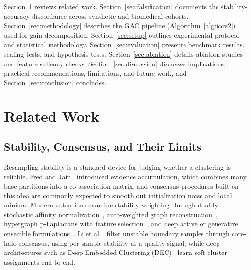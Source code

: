 \documentclass[pdflatex,sn-mathphys-num]{sn-jnl}
\theoremstyle{thmstyleone}
\theoremstyle{thmstyletwo}
\theoremstyle{thmstylethree}
\begin{document}
Section~\ref{sec:related} reviews related work. Section~\ref{sec:falsification} documents the stability-accuracy discordance across synthetic and biomedical cohorts. Section~\ref{sec:methodology} describes the GAC pipeline (Algorithm~\ref{alg:iccv2}) used for gain decomposition. Section~\ref{sec:setup} outlines experimental protocol and statistical methodology. Section~\ref{sec:evaluation} presents benchmark results, scaling tests, and hypothesis tests. Section~\ref{sec:ablation} details ablation studies and feature saliency checks. Section~\ref{sec:discussion} discusses implications, practical recommendations, limitations, and future work, and Section~\ref{sec:conclusion} concludes.


\section{Related Work}\label{sec:related}

\subsection{Stability, Consensus, and Their Limits}\label{sec:rel_stability}

Resampling stability is a standard device for judging whether a clustering is reliable. Fred and Jain~\cite{fred2005combining} introduced evidence accumulation, which combines many base partitions into a co-association matrix, and consensus procedures built on this idea are commonly expected to smooth out initialization noise and local minima. Modern extensions examine stability weighting through doubly stochastic affinity normalization~\cite{cai2025spectral}, auto-weighted graph reconstruction~\cite{yang2025autoweighted}, hypergraph p-Laplacians with feature selection~\cite{hu2024multiview}, and deep active or generative ensemble formulations~\cite{patron2026codac,chen2025ccegan}. Li et al.~\cite{li2019clustering} filter unstable boundary samples through core-halo consensus, using per-sample stability as a quality signal, while deep architectures such as Deep Embedded Clustering (DEC)~\cite{xie2016unsupervised} learn soft cluster assignments end-to-end.
\end{document}
